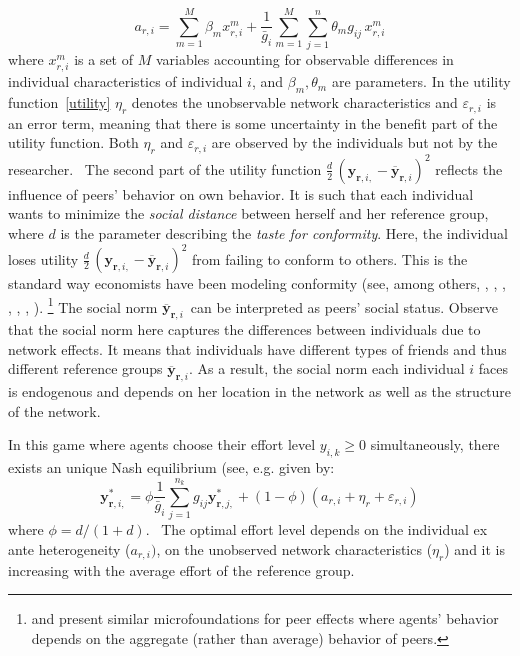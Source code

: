 \documentclass[nojss]{jss}
\begin{document}
\begin{equation}
a_{r, i}=\sum_{m=1}^{M}\beta _{m}x_{r, i}^{m}+\frac{1}{\bar g_{i}}%
\sum_{m=1}^{M}\sum_{j=1}^{n}\theta _{m}g_{ij}\,x_{r, i}^{m}  \label{MUI}
\end{equation}%
where $x_{r, i}^{m}$ is a set of $M$ variables accounting for observable
differences in individual characteristics of individual $i$, and $\beta
_{m},\theta _{m}$ are parameters. In the utility function~\ref{utility} $\eta _{r}$ denotes the unobservable network characteristics and $\varepsilon
_{r, i}$ is an error term, meaning that there is some uncertainty in the
benefit part of the utility function. Both $\eta _{r}$ and $\varepsilon
_{r, i}$ are observed by the individuals but not by the researcher. \ The
second part of the utility function $\frac{d}{2}\,(\mathbf{y}_{\mathbf{r}, i,}-\overline{\mathbf{y}}_{\mathbf{r}, i})^2$ reflects the influence of peers' behavior on own behavior. It is
such that each individual wants to minimize the \emph{social distance}
between herself and her reference group, where $d$ is the parameter
describing the \emph{taste for conformity}. Here, the individual loses
utility $\frac{d}{2}\,(\mathbf{y}_{\mathbf{r}, i,}-\overline{\mathbf{y}}_{\mathbf{r}, i})^2$ from failing to
conform to others. This is the standard way economists have been modeling
conformity (see, among others, \cite{Akerlof1980}, \cite{Bernheim1994}, \cite{Kandel1992}, \cite{Akerlof1997}, \cite{Fershtman1998},  \cite{Patacchini2012}, \cite{PatacchiniRainone2012}).%
\footnote{%
\cite{Ballester+Armengol+Zenou:2006} and \cite{Armengol2009} present similar
microfoundations for peer effects where agents' behavior depends on the
aggregate (rather than average) behavior of peers.}
The social norm $\overline{\mathbf{y}}_{\mathbf{r}, i}$\ can be interpreted as peers' social
status. Observe that the social norm here captures the differences between
individuals due to network effects. It means that individuals have
different types of friends and thus different reference groups $\overline{\mathbf{y}}_{\mathbf{r}, i}$. As a result, the social norm each individual $i$ faces is
endogenous and depends on her location in the network as well as the
structure of the network.

In this game where agents choose their effort level $y_{i,k}\geq 0$
simultaneously, there exists an unique Nash equilibrium (see, e.g. \cite{Patacchini2012} given by:%
\begin{equation}
\mathbf{y}_{\mathbf{r}, i,}^{\ast }=\phi \frac{1}{\bar g_{i}}\sum_{j=1}^{n_{k}}g_{ij}\mathbf{y}_{\mathbf{r}, j,}^{\ast
}+\left( 1-\phi \right) \left( a_{r, i}+\eta _{r}+\varepsilon _{r, i}\right) 
\label{FOC}
\end{equation}%
where $\phi =d/(1+d)$. \ The optimal effort level depends on the individual
ex ante heterogeneity ($a_{r, i})$, on the unobserved network characteristics
($\eta _{r}$) and it is increasing with the average effort of the reference
group. 
\end{document}

